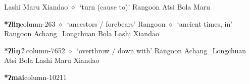          Lashi 
\hspace{1ex}
         Maru 
\hspace{1ex}
         Xiandao 
\hspace{1ex}
         $\diamond$~`turn (cause to)'
         Rangoon 
\hspace{1ex}
         Atsi 
\hspace{1ex}
         Bola 
\hspace{1ex}
         Maru 
  \item {\footnotesize \textbf{*ʔliŋ}}{\tiny column-263}
         $\diamond$~`ancestors / forebears'
         Rangoon 
\hspace{1ex}
         $\diamond$~`ancient times, in'
         Rangoon 
\hspace{1ex}
         Achang\_Longchuan 
\hspace{1ex}
         Bola 
\hspace{1ex}
         Lashi 
\hspace{1ex}
         Xiandao 
  \item {\footnotesize \textbf{*ʔliŋ\,?\,}}{\tiny column-7652}
         $\diamond$~`overthrow / down with'
         Rangoon 
\hspace{1ex}
         Achang\_Longchuan 
\hspace{1ex}
         Atsi 
\hspace{1ex}
         Bola 
\hspace{1ex}
         Lashi 
\hspace{1ex}
         Maru 
\hspace{1ex}
         Xiandao 
  \item {\footnotesize \textbf{*ʔmai}}{\tiny column-10211}
